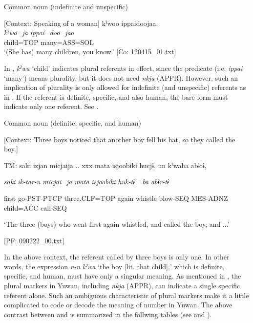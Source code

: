 \ea \label{ex:7:4}  Common noun (indefinite and unspecific)

  [Context: Speaking of a woman]
\glll  kˀwoo  ippaidoojaa.\\
\textit{kˀwa=ja}  \textit{ippai=doo=jaa}\\
child=TOP  many=ASS=SOL\\
\glt ‘(She has) many children, you know.’ [Co: 120415\_01.txt]
\z

In , \textit{kˀwa} ‘child’ indicates plural referents in effect, since the predicate (i.e. \textit{ippai} ‘many’) means plurality, but it does not need \textit{nkja} (APPR). However, such an implication of plurality is only allowed for indefinite (and unspecific) referents as in . If the referent is definite, specific, and also human, the bare form must indicate only one referent. See .

\ea \label{ex:7:5}  Common noun (definite, specific, and human)

  [Context: Three boys noticed that another boy fell his hat, so they called the boy.]

  TM:  saki  izjan  micjaija ..  xxx  mata  isjoobiki  hucjɨ,  un  kˀwaba  abɨtɨ,

    \textit{saki}  \textit{ik-tar-n}  \textit{micjai=ja}    \textit{mata}  \textit{isjoobiki}  \textit{huk-tɨ}  \textit{}  \textit{=ba}  \textit{abɨr-tɨ}
                                                                                                                
    first  go-PST-PTCP  three.CLF=TOP    again  whistle  blow-SEQ  MES-ADNZ  child=ACC  call-SEQ

    ‘The three (boys) who went first again whistled, and called the boy, and ...’

    [PF: 090222\_00.txt]
\z

In the above context, the referent called by three boys is only one. In other words, the expression \textit{u-n} \textit{kˀwa} ‘the boy [lit. that child],’ which is definite, specific, and human, must have only a singular meaning. As mentioned in , the plural markers in Yuwan, including \textit{nkja} (APPR), can indicate a single specific referent alone. Such an ambiguous characteristic of plural markers make it a little complicated to code or decode the meaning of number in Yuwan. The above contrast between  and  is summarized in the follwing tables (see  and ).


